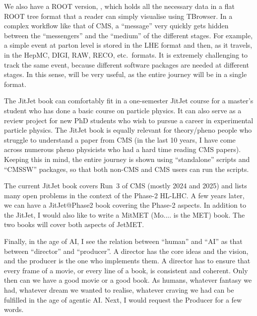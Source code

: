 We also have a ROOT version, , which holds all the necessary data in a flat ROOT tree format that a reader can simply visualise using TBrowser. In a complex workflow like that of CMS, a ``message'' very quickly gets hidden between the ``messengers'' and the ``medium'' of the different stages. For example, a simple event at parton level is stored in the LHE format and then, as it travels, in the HepMC, DIGI, RAW, RECO, etc.\ formats. It is extremely challenging to track the same event, because different software packages are needed at different stages. In this sense,  will be very useful, as the entire journey will be in a single format.

The JitJet book can comfortably fit in a one-semester JitJet course for a master's student who has done a basic course on particle physics. It can also serve as a review project for new PhD students who wish to pursue a career in experimental particle physics. The JitJet book is equally relevant for theory/pheno people who struggle to understand a paper from CMS (in the last 10 years, I have come across numerous pheno physicists who had a hard time reading CMS papers). Keeping this in mind, the entire journey is shown using ``standalone'' scripts and ``CMSSW'' packages, so that both non-CMS and CMS users can run the scripts.

The current JitJet book covers Run~3 of CMS (mostly 2024 and 2025) and lists many open problems in the context of the Phase-2 HL-LHC. A few years later, we can have a JitJet@Phase2 book covering the Phase-2 aspects. In addition to the JitJet, I would also like to write a MitMET (Mo.... is the MET) book. The two books will cover both aspects of JetMET. 

Finally, in the age of AI, I see the relation between ``human'' and ``AI'' as that between ``director'' and ``producer''. A director has the core ideas and the vision, and the producer is the one who implements them. A director has to ensure that every frame of a movie, or every line of a book, is consistent and coherent. Only then can we have a good movie or a good book. As humans, whatever fantasy we had, whatever dream we wanted to realise, whatever craving we had can be fulfilled in the age of agentic AI. Next, I would request the Producer for a few words.



